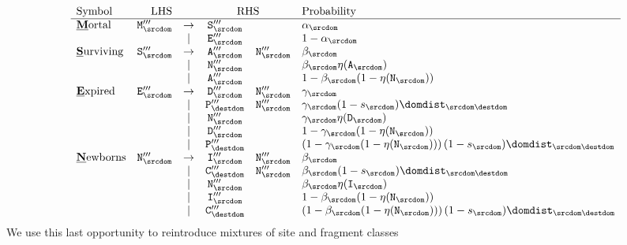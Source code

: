 \[
\begin{array}{lrcccl}
\mbox{Symbol} & \mbox{LHS} & & \multicolumn{2}{c}{\mbox{RHS}} & \mbox{Probability} \\
\hline
\mbox{\underline{\bf M}ortal} & \ntmor'''_\srcdom & \to & \ntsur'''_\srcdom & & \alpha_\srcdom \\
& & | & \ntexp'''_\srcdom & & 1 - \alpha_\srcdom \\
\mbox{\underline{\bf S}urviving} & \ntsur'''_\srcdom & \to & \ntaln'''_\srcdom & \ntnew'''_\srcdom & \beta_\srcdom \\
& & | & \ntnew'''_\srcdom & & \beta_\srcdom \nullability(\ntaln_\srcdom) \\
& & | & \ntaln'''_\srcdom & & 1 - \beta_\srcdom(1 - \nullability(\ntnew_\srcdom)) \\
\mbox{\underline{\bf E}xpired} & \ntexp'''_\srcdom & \to & \ntdel'''_\srcdom & \ntnew'''_\srcdom & \gamma_\srcdom \\
& & | & \ntparent'''_\destdom & \ntnew'''_\srcdom & \gamma_\srcdom (1 - \tok_\srcdom) \domdist_{\srcdom\destdom} \\
& & | & \ntnew'''_\srcdom & & \gamma_\srcdom \nullability(\ntdel_\srcdom) \\
& & | & \ntdel'''_\srcdom & & 1 - \gamma_\srcdom(1 - \nullability(\ntnew_\srcdom)) \\
& & | & \ntparent'''_\destdom & & \left( 1 - \gamma_\srcdom(1 - \nullability(\ntnew_\srcdom)) \right) (1 - \tok_\srcdom) \domdist_{\srcdom\destdom} \\
\mbox{\underline{\bf N}ewborns} & \ntnew'''_\srcdom & \to & \ntins'''_\srcdom & \ntnew'''_\srcdom & \beta_\srcdom \\
& & | & \ntchild'''_\destdom & \ntnew'''_\srcdom & \beta_\srcdom (1 - \tok_\srcdom) \domdist_{\srcdom\destdom} \\
& & | & \ntnew'''_\srcdom & & \beta_\srcdom \nullability(\ntins_\srcdom) \\
& & | & \ntins'''_\srcdom & & 1 - \beta_\srcdom(1 - \nullability(\ntnew_\srcdom)) \\
& & | & \ntchild'''_\destdom & & \left( 1 - \beta_\srcdom(1 - \nullability(\ntnew_\srcdom)) \right) (1 - \tok_\srcdom) \domdist_{\srcdom\destdom} \\
\end{array}
\]
We use this last opportunity to reintroduce mixtures of site and fragment classes

